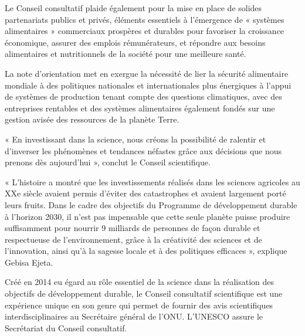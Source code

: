 \documentclass[8pt]{article}
\begin{document}
Le Conseil consultatif plaide également pour la mise en place de solides partenariats publics et privés, éléments essentiels à l’émergence de « systèmes alimentaires » commerciaux prospères et durables pour favoriser la croissance économique, assurer des emplois rémunérateurs, et répondre aux besoins alimentaires et nutritionnels de la société pour une meilleure santé.

La note d’orientation met en exergue la nécessité de lier la sécurité alimentaire mondiale à des politiques nationales et internationales plus énergiques à l’appui de systèmes de production tenant compte des questions climatiques, avec des entreprises rentables et des systèmes alimentaires également fondés sur une gestion avisée des ressources de la planète Terre.

« En investissant dans la science, nous créons la possibilité de ralentir et d’inverser les phénomènes et tendances néfastes grâce aux décisions que nous prenons dès aujourd’hui », conclut le Conseil scientifique.

« L’histoire a montré que les investissements réalisés dans les sciences agricoles au XXe siècle avaient permis d’éviter des catastrophes et avaient largement porté leurs fruits. Dans le cadre des objectifs du Programme de développement durable à l’horizon 2030, il n’est pas impensable que cette seule planète puisse produire suffisamment pour nourrir 9 milliards de personnes de façon durable et respectueuse de l’environnement, grâce à la créativité des sciences et de l’innovation, ainsi qu’à la sagesse locale et à des politiques efficaces », explique Gebisa Ejeta.

Créé en 2014 eu égard au rôle essentiel de la science dans la réalisation des objectifs de développement durable, le Conseil consultatif scientifique est une expérience unique en son genre qui permet de fournir des avis scientifiques interdisciplinaires au Secrétaire général de l’ONU. L’UNESCO assure le Secrétariat du Conseil consultatif.        
\end{document}
